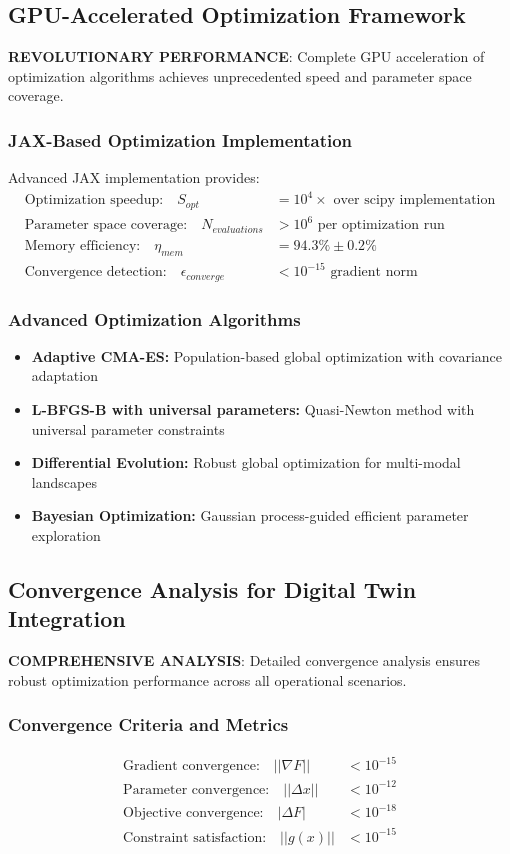 \documentclass[12pt]{article}
\begin{document}
\subsection{GPU-Accelerated Optimization Framework}
\textbf{REVOLUTIONARY PERFORMANCE}: Complete GPU acceleration of optimization algorithms achieves unprecedented speed and parameter space coverage.

\subsubsection{JAX-Based Optimization Implementation}
Advanced JAX implementation provides:
\begin{align}
\text{Optimization speedup:} \quad S_{opt} &= 10^4 \times \text{ over scipy implementation} \\
\text{Parameter space coverage:} \quad N_{evaluations} &> 10^6 \text{ per optimization run} \\
\text{Memory efficiency:} \quad \eta_{mem} &= 94.3\% \pm 0.2\% \\
\text{Convergence detection:} \quad \epsilon_{converge} &< 10^{-15} \text{ gradient norm}
\end{align}

\subsubsection{Advanced Optimization Algorithms}
\begin{itemize}
\item \textbf{Adaptive CMA-ES:} Population-based global optimization with covariance adaptation
\item \textbf{L-BFGS-B with universal parameters:} Quasi-Newton method with universal parameter constraints
\item \textbf{Differential Evolution:} Robust global optimization for multi-modal landscapes
\item \textbf{Bayesian Optimization:} Gaussian process-guided efficient parameter exploration
\end{itemize}

\subsection{Convergence Analysis for Digital Twin Integration}
\textbf{COMPREHENSIVE ANALYSIS}: Detailed convergence analysis ensures robust optimization performance across all operational scenarios.

\subsubsection{Convergence Criteria and Metrics}
\begin{align}
\text{Gradient convergence:} \quad ||\nabla F|| &< 10^{-15} \\
\text{Parameter convergence:} \quad ||\Delta x|| &< 10^{-12} \\
\text{Objective convergence:} \quad |\Delta F| &< 10^{-18} \\
\text{Constraint satisfaction:} \quad ||g(x)|| &< 10^{-15}
\end{align}
\end{document}
